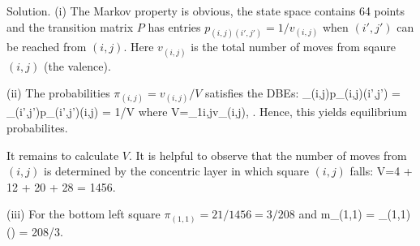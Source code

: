 Solution. (i) The Markov property is obvious, the state space contains 64 points and the transition matrix $P$ has entries $p_{(i,j)(i',j')}=1/v_{(i,j)}$ when $(i',j')$ can be reached from $(i,j)$. Here $v_{(i,j)}$ is the total number of moves from sqaure $(i,j)$ (the valence).

(ii) The probabilities $\pi_{(i,j)} = v_{(i,j)}/V$ satisfies the DBEs:
\be
\pi_{(i,j)}p_{(i,j)(i',j')} = \pi_{(i',j')}p_{(i',j')(i,j)} = 1/V
\ee
where
\be
V=\sum_{1\leq i,j}v_{(i,j)}, \quad {}.
\ee
Hence, this yields equilibrium probabilites.

It remains to calculate $V$. It is helpful to observe that the number of moves from $(i,j)$ is determined by the concentric layer in which square $(i,j)$ falls:
\be
V=4 + 12  + 20 + 28  = 1456.
\ee

(iii) For the bottom left square $\pi_{(1,1)} = 21/1456 = 3/208$ and
\be
m_{(1,1)} = \pro_{(1,1)}() = 208/3.
\ee
